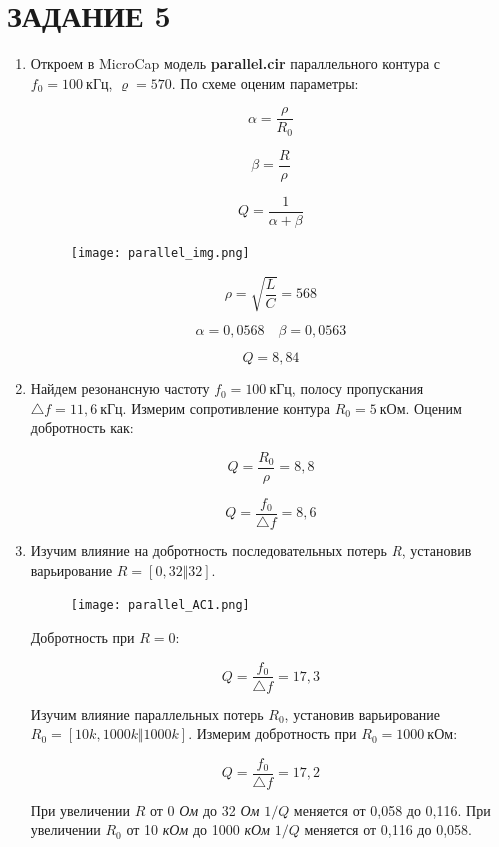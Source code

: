 \documentclass[a4paper, 12pt]{article}%
\begin{document}
\section*{ЗАДАНИЕ 5}

\begin{enumerate}

\item Откроем в MicroCap модель \textbf{parallel.cir} параллельного контура с $f_0 = 100 \: \textit{кГц}$, $\varrho = 570$. По схеме оценим параметры:

\[\alpha = \frac{\rho}{R_0}\]

\[\beta = \frac{R}{\rho}\]

\[Q = \frac{1}{\alpha + \beta}\]

\begin{figure}[h!]
\centering
\texttt{[image: parallel\_img.png]}
\label{fig:Image1}
\end{figure}

\[\rho = \sqrt{\frac{L}{C}} = 568\]

\[\alpha = 0,0568 \quad \beta = 0,0563\]

\[Q = 8,84\]

\item Найдем резонансную частоту $f_0 = 100 \: \textit{кГц}$, полосу пропускания $\triangle f = 11,6 \: \textit{кГц}$. Измерим сопротивление контура $R_0 = 5 \: \textit{кОм}$. Оценим добротность как:

\[Q = \frac{R_0}{\rho} = 8,8\]

\[Q = \frac{f_0}{\triangle f} = 8,6\]

\item Изучим влияние на добротность последовательных потерь \textit{R}, установив варьирование $R = [0, 32 \Vert 32]$.

\begin{figure}[h!]
\centering
\texttt{[image: parallel\_AC1.png]}
\label{fig:Image1}
\end{figure}

Добротность при $R = 0$:

\[Q = \frac{f_0}{\triangle f} = 17,3\]

Изучим влияние параллельных потерь $R_0$, установив варьирование $R_0 = [10k, 1000k \Vert 1000k]$. Измерим добротность при $R_0 = 1000 \: \textit{кОм}$:

\[Q = \frac{f_0}{\triangle f} = 17,2\]

При увеличении $R$ от 0 \textit{Ом} до 32 \textit{Ом} $1/Q$ меняется от 0,058 до 0,116. При увеличении $R_0$ от 10 \textit{кОм} до 1000 \textit{кОм} $1/Q$ меняется от 0,116 до 0,058.


\end{enumerate}
\end{document}
